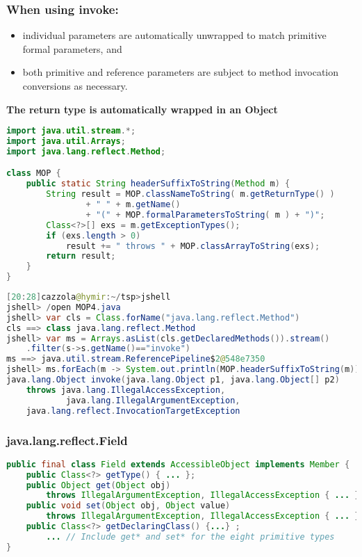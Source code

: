 \subsubsection{When using invoke:}

\begin{itemize}
	\item individual parameters are automatically unwrapped to match primitive formal parameters, and
	\item both primitive and reference parameters are subject to method
invocation conversions as necessary.
\end{itemize}

\textbf{The return type is automatically wrapped in an Object}

\begin{lstlisting}[language=Java]
import java.util.stream.*;
import java.util.Arrays;
import java.lang.reflect.Method;

class MOP {
	public static String headerSuffixToString(Method m) {
		String result = MOP.classNameToString( m.getReturnType() )
				+ " " + m.getName()
				+ "(" + MOP.formalParametersToString( m ) + ")";
		Class<?>[] exs = m.getExceptionTypes();
		if (exs.length > 0)
			result += " throws " + MOP.classArrayToString(exs);
		return result;
	}
}
\end{lstlisting}

\begin{lstlisting}[language=Java]
[20:28]cazzola@hymir:~/tsp>jshell
jshell> /open MOP4.java
jshell> var cls = Class.forName("java.lang.reflect.Method")
cls ==> class java.lang.reflect.Method
jshell> var ms = Arrays.asList(cls.getDeclaredMethods()).stream()
	.filter(s->s.getName()=="invoke")
ms ==> java.util.stream.ReferencePipeline$2@548e7350
jshell> ms.forEach(m -> System.out.println(MOP.headerSuffixToString(m)))
java.lang.Object invoke(java.lang.Object p1, java.lang.Object[] p2)
	throws java.lang.IllegalAccessException,
			java.lang.IllegalArgumentException,
	java.lang.reflect.InvocationTargetException
\end{lstlisting}

\subsubsection{java.lang.reflect.Field}

\begin{lstlisting}[language=Java]
public final class Field extends AccessibleObject implements Member {
	public Class<?> getType() { ... };
	public Object get(Object obj)
		throws IllegalArgumentException, IllegalAccessException { ... };
	public void set(Object obj, Object value)
		throws IllegalArgumentException, IllegalAccessException { ... };
	public Class<?> getDeclaringClass() {...} ;
		... // Include get* and set* for the eight primitive types
}
\end{lstlisting}

